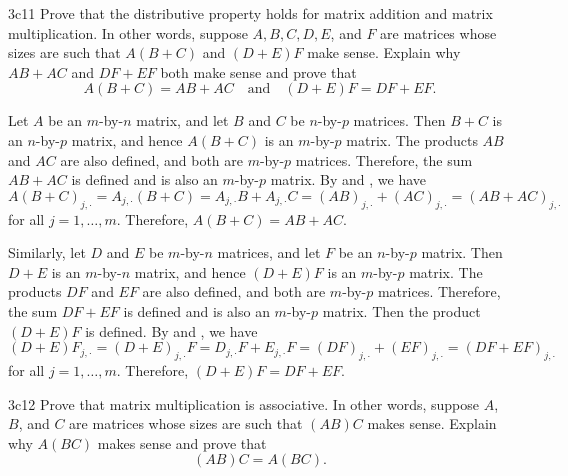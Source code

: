 \begin{exercise}{3c11}
    Prove that the distributive property holds for matrix addition and matrix multiplication.
	In other words, suppose $A, B, C, D, E$, and $F$ are matrices whose sizes are such that $A(B + C)$ and $(D + E)F$ make sense.
	Explain why $AB + AC$ and $DF + EF$ both make sense and prove that
    \[
    	A(B + C) = AB + AC \quad \text{and} \quad (D + E)F = DF + EF.
    \]
\end{exercise}

\begin{sol}
    Let $A$ be an $m$-by-$n$ matrix, and let $B$ and $C$ be $n$-by-$p$ matrices.
	Then $B + C$ is an $n$-by-$p$ matrix, and hence $A(B + C)$ is an $m$-by-$p$ matrix.
	The products $AB$ and $AC$ are also defined, and both are $m$-by-$p$ matrices.
	Therefore, the sum $AB + AC$ is defined and is also an $m$-by-$p$ matrix.
	By  and , we have
    \[
    	A(B + C)_{j, \cdot} = A_{j, \cdot} (B + C) = A_{j, \cdot} B + A_{j, \cdot} C = (AB)_{j, \cdot} + (AC)_{j, \cdot} = (AB + AC)_{j, \cdot}
    \]
    for all $j = 1, \ldots, m$.
	Therefore, $A(B + C) = AB + AC$.

    Similarly, let $D$ and $E$ be $m$-by-$n$ matrices, and let $F$ be an $n$-by-$p$ matrix.
	Then $D + E$ is an $m$-by-$n$ matrix, and hence $(D + E)F$ is an $m$-by-$p$ matrix.
	The products $DF$ and $EF$ are also defined, and both are $m$-by-$p$ matrices.
	Therefore, the sum $DF + EF$ is defined and is also an $m$-by-$p$ matrix.
	Then the product $(D + E)F$ is defined.
	By  and , we have
    \[
    	(D + E)F_{j, \cdot} = (D + E)_{j, \cdot} F = D_{j, \cdot} F + E_{j, \cdot} F = (DF)_{j, \cdot} + (EF)_{j, \cdot} = (DF + EF)_{j, \cdot}
    \]
    for all $j = 1, \ldots, m$.
	Therefore, $(D + E)F = DF + EF$.
\end{sol}

\begin{exercise}{3c12}
    Prove that matrix multiplication is associative.
	In other words, suppose $A$, $B$, and $C$ are matrices whose sizes are such that $(AB)C$ makes sense.
	Explain why $A(BC)$ makes sense and prove that
    \[
    	(AB)C = A(BC).
    \]
\end{exercise}

